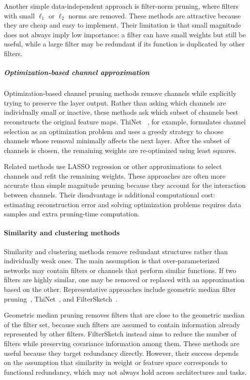 \documentclass[12pt,a4paper]{report}
\begin{document}
Another simple data-independent approach is filter-norm pruning, where filters with small
$\ell_1$ or $\ell_2$ norms are removed. These methods are attractive because they are cheap and
easy to implement. Their limitation is that small magnitude does not always imply low importance:
a filter can have small weights but still be useful, while a large filter may be redundant if its
function is duplicated by other filters.

\subparagraph{Optimization-based channel approximation}
Optimization-based channel pruning methods remove channels while explicitly trying to preserve
the layer output. Rather than asking which channels are individually small or inactive, these
methods ask which subset of channels best reconstructs the original feature maps. ThiNet
~\cite{luo2017thinet}, for example, formulates channel selection as an optimization problem and
uses a greedy strategy to choose channels whose removal minimally affects the next layer. After
the subset of channels is chosen, the remaining weights are re-optimized using least squares.

Related methods use LASSO regression or other approximations to select channels and refit the
remaining weights. These approaches are often more accurate than simple magnitude pruning
because they account for the interaction between channels. Their disadvantage is additional
computational cost: estimating reconstruction error and solving optimization problems requires
data samples and extra pruning-time computation.

\paragraph{Similarity and clustering methods}
Similarity and clustering methods remove redundant structures rather than individually weak
ones. The main assumption is that over-parameterized networks may contain filters or channels
that perform similar functions. If two filters are highly similar, one may be removed or replaced
with an approximation based on the other. Representative approaches include geometric median
filter pruning~\cite{he2019filter}, ThiNet~\cite{luo2017thinet}, and FilterSketch~\cite{lin2021filter}.

Geometric median pruning removes filters that are close to the geometric median of the filter set,
because such filters are assumed to contain information already represented by other filters.
FilterSketch instead aims to reduce the number of filters while preserving covariance information
among them. These methods are useful because they target redundancy directly. However, their
success depends on the assumption that similarity in weight or feature space corresponds to
functional redundancy, which may not always hold across architectures and tasks.
\end{document}
